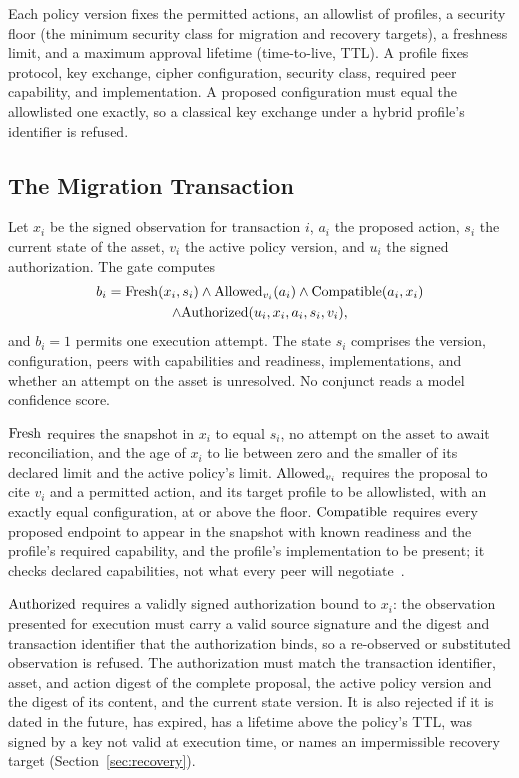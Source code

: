 Each policy version fixes the permitted actions, an allowlist of profiles, a security floor (the minimum security class for migration and recovery targets), a freshness limit, and a maximum approval lifetime (time-to-live, TTL). A profile fixes protocol, key exchange, cipher configuration, security class, required peer capability, and implementation. A proposed configuration must equal the allowlisted one exactly, so a classical key exchange under a hybrid profile's identifier is refused.

\subsection{The Migration Transaction}
\label{sec:txn}
Let $x_i$ be the signed observation for transaction $i$, $a_i$ the proposed action, $s_i$ the current state of the asset, $v_i$ the active policy version, and $u_i$ the signed authorization. The gate computes
\begin{multline}
\label{eq:gate}
b_i = \mathrm{Fresh}(x_i,s_i) \wedge \mathrm{Allowed}_{v_i}(a_i) \wedge \mathrm{Compatible}(a_i,x_i) \\
\wedge \mathrm{Authorized}(u_i,x_i,a_i,s_i,v_i),
\end{multline}
and $b_i=1$ permits one execution attempt. The state $s_i$ comprises the version, configuration, peers with capabilities and readiness, implementations, and whether an attempt on the asset is unresolved. No conjunct reads a model confidence score.

$\mathrm{Fresh}$ requires the snapshot in $x_i$ to equal $s_i$, no attempt on the asset to await reconciliation, and the age of $x_i$ to lie between zero and the smaller of its declared limit and the active policy's limit. $\mathrm{Allowed}_{v_i}$ requires the proposal to cite $v_i$ and a permitted action, and its target profile to be allowlisted, with an exactly equal configuration, at or above the floor. $\mathrm{Compatible}$ requires every proposed endpoint to appear in the snapshot with known readiness and the profile's required capability, and the profile's implementation to be present; it checks declared capabilities, not what every peer will negotiate~\cite{han}.

$\mathrm{Authorized}$ requires a validly signed authorization bound to $x_i$: the observation presented for execution must carry a valid source signature and the digest and transaction identifier that the authorization binds, so a re-observed or substituted observation is refused. The authorization must match the transaction identifier, asset, and action digest of the complete proposal, the active policy version and the digest of its content, and the current state version. It is also rejected if it is dated in the future, has expired, has a lifetime above the policy's TTL, was signed by a key not valid at execution time, or names an impermissible recovery target (Section~\ref{sec:recovery}).

